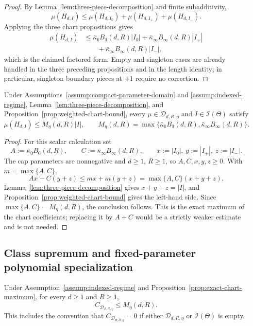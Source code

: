 \begin{proof}
By Lemma~\ref{lem:three-piece-decomposition} and finite subadditivity,
\[
\mu(H_{d,I})
\leq\mu(H_{d,I_0})+\mu(H_{d,I_+})+\mu(H_{d,I_-}).
\]
Applying the three chart propositions gives
\[
\begin{aligned}
\mu(H_{d,I})
&\leq\bar\kappa_0B_0(d,R)|I_0|
 +\bar\kappa_\infty B_\infty(d,R)|I_+|\\
&\qquad+\bar\kappa_\infty B_\infty(d,R)|I_-|,
\end{aligned}
\]
which is the claimed factored form.  Empty and singleton cases are already
handled in the three preceding propositions and in the length identity; in
particular, singleton boundary pieces at $\pm1$ require no correction.
\end{proof}

\begin{proposition}
\label{prop:exact-chart-maximum}
Under Assumptions~\ref{assump:compact-parameter-domain} and
\ref{assump:indexed-regime}, Lemma~\ref{lem:three-piece-decomposition}, and
Proposition~\ref{prop:weighted-chart-bound}, every
$\mu\in\mathcal D_{d,R,\eta}$ and $I\in\mathcal I(\Theta)$ satisfy
\[
\mu(H_{d,I})\leq M_\eta(d,R)|I|,
\qquad
M_\eta(d,R)=\max\{\bar\kappa_0B_0(d,R),
\bar\kappa_\infty B_\infty(d,R)\}.
\]
\end{proposition}

\begin{proof}
For this scalar calculation set
\[
A:=\bar\kappa_0B_0(d,R),\qquad
C:=\bar\kappa_\infty B_\infty(d,R),\qquad
x:=|I_0|,\ y:=|I_+|,\ z:=|I_-|.
\]
The cap parameters are nonnegative and $d\geq1$, $R\geq1$, so
$A,C,x,y,z\geq0$.  With $m=\max\{A,C\}$,
\[
Ax+C(y+z)\leq mx+m(y+z)=\max\{A,C\}(x+y+z).
\]
Lemma~\ref{lem:three-piece-decomposition} gives
$x+y+z=|I|$, and Proposition~\ref{prop:weighted-chart-bound} gives the
left-hand side.  Since $\max\{A,C\}=M_\eta(d,R)$, the conclusion follows.
This is the exact maximum of the chart coefficients; replacing it by $A+C$
would be a strictly weaker estimate and is not needed.
\end{proof}

\subsection{Class supremum and fixed-parameter polynomial specialization}
\label{app:class-and-rate}

\begin{proposition}
\label{prop:class-supremum}
Under Assumption~\ref{assump:indexed-regime} and
Proposition~\ref{prop:exact-chart-maximum}, for every $d\geq1$ and $R\geq1$,
\[
C_{\mathcal D_{d,R,\eta}}\leq M_\eta(d,R).
\]
This includes the convention that $C_{\mathcal D_{d,R,\eta}}=0$ if either
$\mathcal D_{d,R,\eta}$ or $\mathcal I(\Theta)$ is empty.
\end{proposition}

